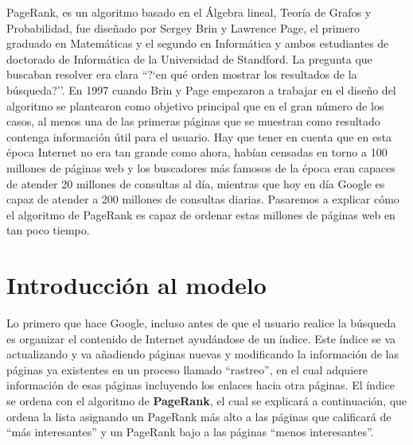 \documentclass[size=a4, parskip=half, titlepage=false, toc=flat, toc=bib, 12pt]{scrartcl}
\theoremstyle{theorem-style}
\theoremstyle{definition-style}
\theoremstyle{remark-style}
\theoremstyle{example-style}
\theoremstyle{definition-style}
\theoremstyle{remark-style}
\begin{document}
PageRank, es un algoritmo basado en el Álgebra lineal, Teoría de Grafos y Probabilidad, fue diseñado por Sergey Brin y Lawrence Page, el primero graduado en Matemáticas y el segundo en Informática y ambos estudiantes de doctorado de Informática de la Universidad de Standford. La pregunta que buscaban resolver era clara ``?`en qué orden mostrar los resultados de la búsqueda?''. En 1997 cuando Brin y Page empezaron a trabajar en el diseño del algoritmo se plantearon como objetivo principal que en el gran número de los casos, al menos una de las primeras páginas que se muestran como resultado contenga información útil para el usuario. Hay que tener en cuenta que en esta época Internet no era tan grande como ahora, habían censadas en torno a 100 millones de páginas web y los buscadores más famosos de la época eran capaces de atender 20 millones de consultas al día, mientras que hoy en día Google es capaz de atender a 200 millones de consultas diarias. Pasaremos a explicar cómo el algoritmo de PageRank es capaz de ordenar estas millones de páginas web en tan poco tiempo.

\section{Introducción al modelo}
Lo primero que hace Google, incluso antes de que el usuario realice la búsqueda es organizar el contenido de Internet ayudándose de un índice. Este índice se va actualizando y va añadiendo páginas nuevas y modificando la información de las páginas ya existentes en un proceso llamado ``rastreo'', en el cual adquiere información de esas páginas incluyendo los enlaces hacia otra páginas. El índice se ordena con el algoritmo de \textbf{PageRank}, el cual se explicará a continuación, que ordena la lista asignando un PageRank más alto a las páginas que calificará de ``más interesantes'' y un PageRank bajo a las páginas ``menos interesantes''.
\end{document}
